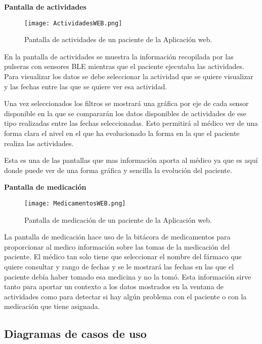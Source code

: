 \textbf{Pantalla de actividades}
\newline

\begin{figure}[H]
  \centering
  \texttt{[image: ActividadesWEB.png]}
  \caption{Pantalla de actividades de un paciente de la Aplicación web.}
\end{figure}

En la pantalla de actividades se muestra la información recopilada por las pulseras con sensores BLE mientras que el paciente ejecutaba las actividades. Para visualizar los datos se debe seleccionar la actividad que se quiere visualizar y las fechas entre las que se quiere ver esa actividad.
\newline

Una vez seleccionados los filtros se mostrará una gráfica por eje de cada sensor disponible en la que se compararán los datos disponibles de actividades de ese tipo realizadas entre las fechas seleccionadas. Esto permitirá al médico ver de una forma clara el nivel en el que ha evolucionado la forma en la que el paciente realiza las actividades.
\newline

Esta es una de las pantallas que mas información aporta al médico ya que es aquí donde puede ver de una forma gráfica y sencilla la evolución del paciente.
\newline
\newpage

\textbf{Pantalla de medicación}
\newline

\begin{figure}[H]
  \centering
  \texttt{[image: MedicamentosWEB.png]}
  \caption{Pantalla de medicación de un paciente de la Aplicación web.}
\end{figure}

La pantalla de medicación hace uso de la bitácora de medicamentos para proporcionar al medico información sobre las tomas de la medicación del paciente. El médico tan solo tiene que seleccionar el nombre del fármaco que quiere consultar y rango de fechas y se le mostrará las fechas en las que el paciente debía haber tomado esa medicina y no la tomó. Esta información sirve tanto para aportar un contexto a los datos mostrados en la ventana de actividades como para detectar si hay algún problema con el paciente o con la medicación que tiene asignada.

\subsection{Diagramas de casos de uso}

